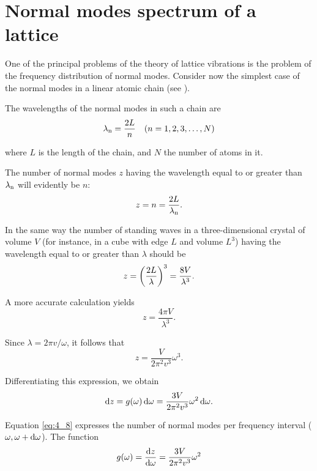 \section{Normal modes spectrum of a lattice}\label{sec:31}

One of the principal problems of the theory of lattice vibrations is the problem of the frequency distribution of normal modes. Consider now the simplest case of the normal modes in a linear atomic chain (see ).

The wavelengths of the normal modes in such a chain are
\begin{equation}\label{eq:4_5}
    \lambda_{\text{n}} = \frac{2 L}{n}\quad (n=1,2,3,\ldots,N)
\end{equation}

\noindent
where $L$ is the length of the chain, and $N$ the number of atoms in it.

The number of normal modes $z$ having the wavelength equal to or greater than $\lambda_{\text{n}}$ will evidently be $n$:
\begin{equation*}
    z = n = \frac{2L}{\lambda_{\text{n}}}.
\end{equation*}

In the same way the number of standing waves in a three-dimensional crystal of volume $V$ (for instance, in a cube with edge $L$ and volume $L^3$) having the wavelength equal to or greater than $\lambda$ should be
\begin{equation*}
    z = \left(\frac{2L}{\lambda}\right)^3 = \frac{8V}{\lambda^3}.
\end{equation*}

\noindent
A more accurate calculation yields
\begin{equation}\label{eq:4_6}
    z = \frac{4\pi V}{\lambda^3}.
\end{equation}

Since $\lambda=2\pi v/\omega$, it follows that
\begin{equation}\label{eq:4_7}
    z = \frac{V}{2\pi^2 v^3}\omega^3.
\end{equation}

\noindent
Differentiating this expression, we obtain
\begin{equation}\label{eq:4_8}
    \mathrm{d} z = g(\omega)\, \mathrm{d}\omega = \frac{3V}{2\pi^2 v^3}\omega^2\, \mathrm{d}\omega.
\end{equation}

Equation \eqref{eq:4_8} expresses the number of normal modes per frequency interval ($\omega, \omega+\mathrm{d}\omega$). The function
\begin{equation}\label{eq:4_9}
    g(\omega) = \dfrac{\mathrm{d} z}{\mathrm{d}\omega} = \frac{3V}{2\pi^2 v^3}\omega^2
\end{equation}

